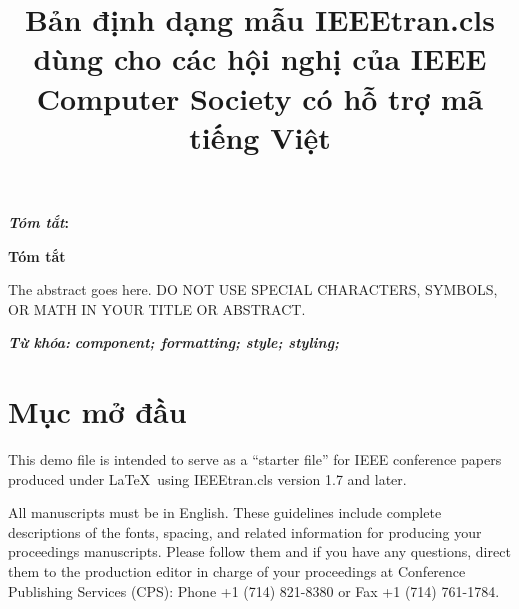 \documentclass[9pt, conference, a4paper, compsocconf]{IEEEtran}
\makeatletter
\renewenvironment{abstract}
  {\normalfont
   \if@twocolumn
     \@IEEEabskeysecsize\bfseries\textit{\abstractname}: 
   \else
     \begin{center}\@IEEEabskeysecsize\textbf{\abstractname}\end{center}
     \@IEEEabskeysecsize
     \setlength{\parindent}{0pt}   %
     \noindent
   \fi}
  {\par}
\renewenvironment{abstract}
  {\normalfont
   \@IEEEabskeysecsize
   \setlength{\parindent}{0pt}
   \noindent
   \if@twocolumn
     \bfseries\textit{\abstractname}: 
   \else
     \begin{center}\textbf{\abstractname}\end{center}
   \fi}
  {\par}
\renewenvironment{IEEEkeywords}
  {\normalfont
   \@IEEEabskeysecsize
   \vspace{0.3em}       
   \setlength{\parindent}{0pt}
   \noindent
   {\bfseries\itshape \IEEEkeywordsname: }\ignorespaces}
  {\par}
\renewcommand{\abstractname}{Tóm tắt}
\renewcommand{\IEEEkeywordsname}{Từ khóa}
\makeatother
\begin{document}
\fontsize{9}{10}
\selectfont




%
\title{Bản định dạng mẫu IEEEtran.cls dùng cho các hội nghị của IEEE Computer Society có hỗ trợ mã tiếng Việt}



\author{
}


\maketitle


\begin{abstract}
The abstract goes here. DO NOT USE SPECIAL CHARACTERS, SYMBOLS, OR MATH IN YOUR TITLE OR ABSTRACT.

\end{abstract}

\begin{IEEEkeywords}
\textbf{\textit{component; formatting; style; styling;
}}
\end{IEEEkeywords}


\IEEEpeerreviewmaketitle



\section{Mục mở đầu}
This demo file is intended to serve as a ``starter file''
for IEEE conference papers produced under \LaTeX\ using
IEEEtran.cls version 1.7 and later.

All manuscripts must be in English. These guidelines include complete descriptions of the fonts, spacing, and related information for producing your proceedings manuscripts. Please follow them and if you have any questions, direct them to the production editor in charge of your proceedings at Conference Publishing Services (CPS): Phone +1 (714) 821-8380 or Fax +1 (714) 761-1784.
\end{document}
